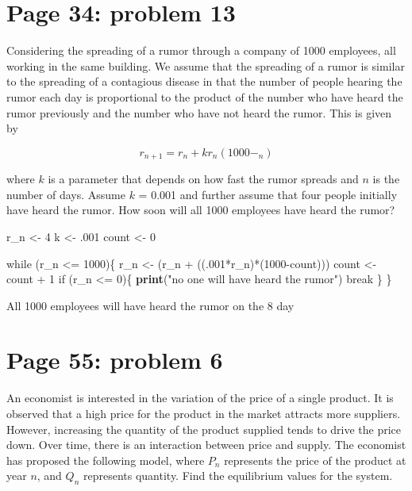\documentclass[]{article}
\newenvironment{Shaded}{\begin{snugshade}}{\end{snugshade}}
\newcommand{\KeywordTok}[1]{\textcolor[rgb]{0.13,0.29,0.53}{\textbf{{#1}}}}
\newcommand{\DecValTok}[1]{\textcolor[rgb]{0.00,0.00,0.81}{{#1}}}
\newcommand{\StringTok}[1]{\textcolor[rgb]{0.31,0.60,0.02}{{#1}}}
\newcommand{\NormalTok}[1]{{#1}}
\begin{document}
\section{Page 34: problem 13}\label{page-34-problem-13}

Considering the spreading of a rumor through a company of 1000
employees, all working in the same building. We assume that the
spreading of a rumor is similar to the spreading of a contagious disease
in that the number of people hearing the rumor each day is proportional
to the product of the number who have heard the rumor previously and the
number who have not heard the rumor. This is given by

\[r_{n+1} = r_n + kr_n(1000-_n)\]

where \(k\) is a parameter that depends on how fast the rumor spreads
and \(n\) is the number of days. Assume \(k\) = 0.001 and further assume
that four people initially have heard the rumor. How soon will all 1000
employees have heard the rumor?

\begin{Shaded}
\begin{Highlighting}[]
\NormalTok{r_n <-}\StringTok{ }\DecValTok{4}
\NormalTok{k <-}\StringTok{ }\NormalTok{.}\DecValTok{001}
\NormalTok{count <-}\StringTok{ }\DecValTok{0}

\NormalTok{while (r_n <=}\StringTok{ }\DecValTok{1000}\NormalTok{)\{}
\NormalTok{r_n <-}\StringTok{ }\NormalTok{(r_n +}\StringTok{ }\NormalTok{((.}\DecValTok{001}\NormalTok{*r_n)*(}\DecValTok{1000}\NormalTok{-count)))}
\NormalTok{count <-}\StringTok{ }\NormalTok{count +}\StringTok{ }\DecValTok{1}
\NormalTok{if (r_n <=}\StringTok{ }\DecValTok{0}\NormalTok{)\{}
  \KeywordTok{print}\NormalTok{(}\StringTok{"no one will have heard the rumor"}\NormalTok{)}
  \NormalTok{break}
 \NormalTok{\}}
\NormalTok{\}}
\end{Highlighting}
\end{Shaded}

All 1000 employees will have heard the rumor on the 8 day

\section{Page 55: problem 6}\label{page-55-problem-6}

An economist is interested in the variation of the price of a single
product. It is observed that a high price for the product in the market
attracts more suppliers. However, increasing the quantity of the product
supplied tends to drive the price down. Over time, there is an
interaction between price and supply. The economist has proposed the
following model, where \(P_n\) represents the price of the product at
year \(n\), and \(Q_n\) represents quantity. Find the equilibrium values
for the system.
\end{document}

